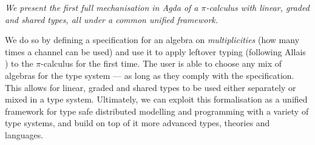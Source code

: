 \documentclass[sigplan,10pt,anonymous,review]{acmart}
\theoremstyle{definition}
\newcommand{\picalc}{$\pi$-calculus}
\begin{document}
\emph{We present the first full mechanisation in Agda of a \picalc{} with linear, graded and shared types, all under a common unified framework.}

We do so by defining a specification for an algebra on \emph{multiplicities} (how many times a channel can be used) and use it to apply leftover typing (following Allais \cite{Allais2018a}) to the \picalc{} for the first time.
The user is able to choose any mix of algebras for the type system --- as long as they comply with the specification.
This allows for linear, graded and shared types to be used either separately or mixed in a type system.
Ultimately, we can exploit this formalisation as a unified framework for type safe distributed modelling and programming with a variety of type systems, and build on top of it more advanced types, theories and languages.
\end{document}
